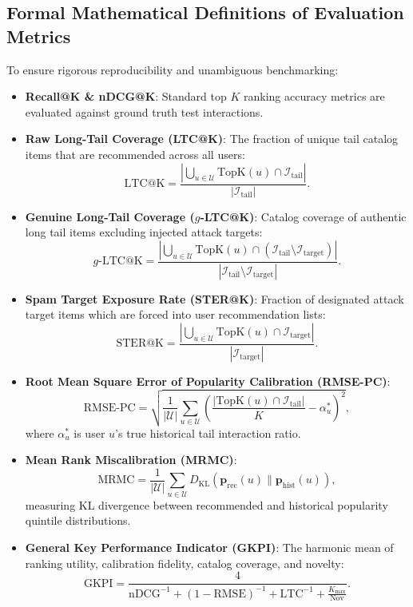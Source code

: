 \documentclass[10pt,journal]{IEEEtran}
\begin{document}
\subsection{Formal Mathematical Definitions of Evaluation Metrics}
To ensure rigorous reproducibility and unambiguous benchmarking:
\begin{itemize}
    \item \textbf{Recall@K \& nDCG@K}: Standard top $K$ ranking accuracy metrics are evaluated against ground truth test interactions.
    \item \textbf{Raw Long-Tail Coverage (LTC@K)}: The fraction of unique tail catalog items that are recommended across all users:
    \begin{equation}
        \text{LTC@K} = \frac{|\bigcup_{u \in \mathcal{U}} \text{TopK}(u) \cap \mathcal{I}_{\text{tail}}|}{|\mathcal{I}_{\text{tail}}|}.
    \end{equation}
    \item \textbf{Genuine Long-Tail Coverage ($g$-LTC@K)}: Catalog coverage of authentic long tail items excluding injected attack targets:
    \begin{equation}
        g\text{-LTC@K} = \frac{|\bigcup_{u \in \mathcal{U}} \text{TopK}(u) \cap (\mathcal{I}_{\text{tail}} \setminus \mathcal{I}_{\text{target}})|}{|\mathcal{I}_{\text{tail}} \setminus \mathcal{I}_{\text{target}}|}.
    \end{equation}
    \item \textbf{Spam Target Exposure Rate (STER@K)}: Fraction of designated attack target items which are forced into user recommendation lists:
    \begin{equation}
        \text{STER@K} = \frac{|\bigcup_{u \in \mathcal{U}} \text{TopK}(u) \cap \mathcal{I}_{\text{target}}|}{|\mathcal{I}_{\text{target}}|}.
    \end{equation}
    \item \textbf{Root Mean Square Error of Popularity Calibration (RMSE-PC)}:
    \begin{equation}
        \text{RMSE-PC} = \sqrt{\frac{1}{|\mathcal{U}|} \sum_{u \in \mathcal{U}} \left( \frac{|\text{TopK}(u) \cap \mathcal{I}_{\text{tail}}|}{K} - \alpha_u^* \right)^2},
    \end{equation}
    where $\alpha_u^*$ is user $u$'s true historical tail interaction ratio.
    \item \textbf{Mean Rank Miscalibration (MRMC)}:
    \begin{equation}
        \text{MRMC} = \frac{1}{|\mathcal{U}|} \sum_{u \in \mathcal{U}} D_{\text{KL}}(\mathbf{p}_{\text{rec}}(u) \parallel \mathbf{p}_{\text{hist}}(u)),
    \end{equation}
    measuring KL divergence between recommended and historical popularity quintile distributions.
    \item \textbf{General Key Performance Indicator (GKPI)}: The harmonic mean of ranking utility, calibration fidelity, catalog coverage, and novelty:
    \begin{equation}
        \text{GKPI} = \frac{4}{\text{nDCG}^{-1} + (1 - \text{RMSE})^{-1} + \text{LTC}^{-1} + \frac{K_{\text{max}}}{\text{Nov}}}.
    \end{equation}
\end{itemize}
\end{document}
